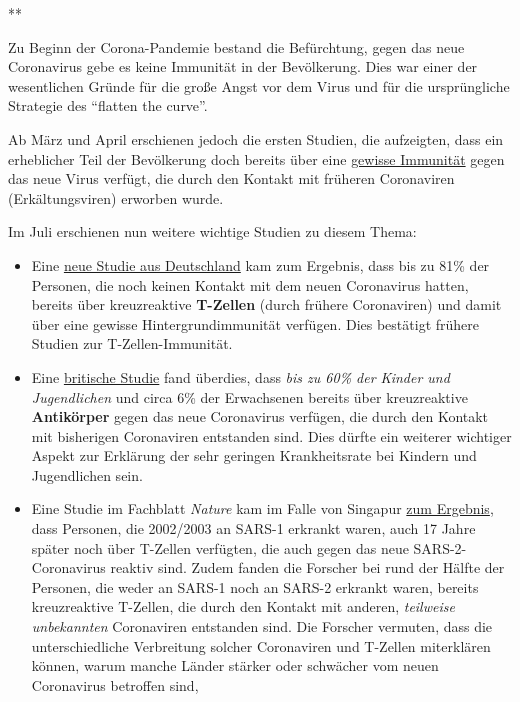 **

Zu Beginn der Corona-Pandemie bestand die Befürchtung, gegen das neue
Coronavirus gebe es keine Immunität in der Bevölkerung. Dies war einer
der wesentlichen Gründe für die große Angst vor dem Virus und für die
ursprüngliche Strategie des ``flatten the curve''.

Ab März und April erschienen jedoch die ersten Studien, die aufzeigten,
dass ein erheblicher Teil der Bevölkerung doch bereits über eine
\href{https://www.cell.com/cell/fulltext/S0092-8674(20)30610-3}{gewisse
Immunität} gegen das neue Virus verfügt, die durch den Kontakt mit
früheren Coronaviren (Erkältungsviren) erworben wurde.

Im Juli erschienen nun weitere wichtige Studien zu diesem Thema:

\begin{itemize}
\tightlist
\item
  Eine \href{https://www.researchsquare.com/article/rs-35331/v1}{neue
  Studie aus Deutschland} kam zum Ergebnis, dass bis zu 81\% der
  Personen, die noch keinen Kontakt mit dem neuen Coronavirus hatten,
  bereits über kreuzreaktive \textbf{T-Zellen} (durch frühere
  Coronaviren) und damit über eine gewisse Hinter­grund­immunität
  verfügen. Dies bestätigt frühere Studien zur T-Zellen-Immunität.
\item
  Eine
  \href{https://www.biorxiv.org/content/10.1101/2020.05.14.095414v2}{britische
  Studie} fand überdies, dass \emph{bis zu 60\% der Kinder und
  Jugendlichen} und circa 6\% der Erwachsenen bereits über kreuzreaktive
  \textbf{Antikörper} gegen das neue Coronavirus verfügen, die durch den
  Kontakt mit bisherigen Coronaviren entstanden sind. Dies dürfte ein
  weiterer wichtiger Aspekt zur Erklärung der sehr geringen
  Krankheitsrate bei Kindern und Jugendlichen sein.
\item
  Eine Studie im Fachblatt \emph{Nature} kam im Falle von Singapur
  \href{https://www.nature.com/articles/s41586-020-2550-z}{zum
  Ergebnis}, dass Personen, die 2002/2003 an SARS-1 erkrankt waren, auch
  17 Jahre später noch über T-Zellen verfügten, die auch gegen das neue
  SARS-2-Coronavirus reaktiv sind. Zudem fanden die Forscher bei rund
  der Hälfte der Personen, die weder an SARS-1 noch an SARS-2 erkrankt
  waren, bereits kreuzreaktive T-Zellen, die durch den Kontakt mit
  anderen, \emph{teilweise unbekannten} Coronaviren entstanden sind. Die
  Forscher vermuten, dass die unterschiedliche Verbreitung solcher
  Coronaviren und T-Zellen miterklären können, warum manche Länder
  stärker oder schwächer vom neuen Coronavirus betroffen sind,

\end{itemize}
